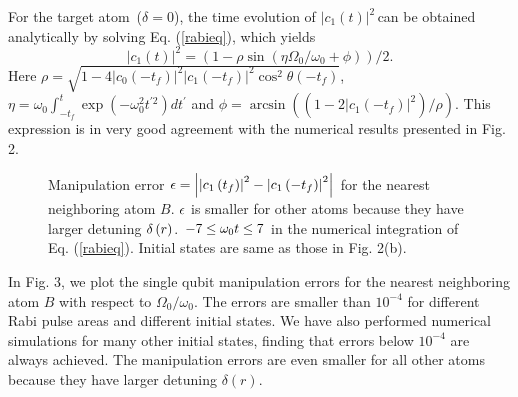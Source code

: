 \documentclass[pra,aps,showpacs,twocolumn]{revtex4}
\begin{document}
For the target atom\ ($\delta =0$), the time evolution of $\left\vert
c_{1}\left( t\right) \right\vert ^{2}\,$can be obtained analytically by
solving Eq. (\ref{rabieq}), which yields%
\begin{equation}
\left\vert c_{1}\left( t\right) \right\vert ^{2}=\left( 1-\rho \sin \left(
\eta \Omega _{0}/\omega _{0}+\phi \right) \right) /2.  \label{ana}
\end{equation}%
Here $\rho =\sqrt{1-4\left\vert c_{0}\left( -t_{f}\right) \right\vert
^{2}\left\vert c_{1}\left( -t_{f}\right) \right\vert ^{2}\cos ^{2}\theta
\left( -t_{f}\right) }$, $\eta =\omega _{0}\int_{-t_{f}}^{t}\exp \left(
-\omega _{0}^{2}t^{\prime 2}\right) dt^{\prime }$ and $\phi =\arcsin \left(
\left( 1-2\left\vert c_{1}\left( -t_{f}\right) \right\vert ^{2}\right) /\rho
\right) $. This expression is in very good agreement with the numerical
results presented in Fig. 2. 
\begin{figure}[t]
\begin{center}
\vspace*{-0.0cm}
\par
{}
\end{center}
\par
\vspace*{-0.5cm}
\caption{Manipulation error $\protect\epsilon =\left\vert \left\vert
c_{1}\left( t_{f}\right) \right\vert ^{2}-\left\vert c_{1}\left(
-t_{f}\right) \right\vert ^{2}\right\vert $ for the nearest neighboring atom 
$B$. $\protect\epsilon $ is smaller for other atoms because they have larger
detuning $\protect\delta \left( r\right) $. $-7\leq \protect\omega _{0}t\leq
7$ in the numerical integration of Eq. (\protect\ref{rabieq}). Initial
states are same as those in Fig. 2(b).}
\label{rr3}
\end{figure}
In Fig. 3, we plot the single qubit manipulation errors for the nearest
neighboring atom $B$ with respect to $\Omega _{0}/\omega _{0}$. The errors
are smaller than $10^{-4}$ for different Rabi pulse areas and different
initial states. We have also performed numerical simulations for many other
initial states, finding that errors below $10^{-4}$ are always achieved. The
manipulation errors are even smaller for all other atoms because they have
larger detuning $\delta \left( r\right) $.
\end{document}
